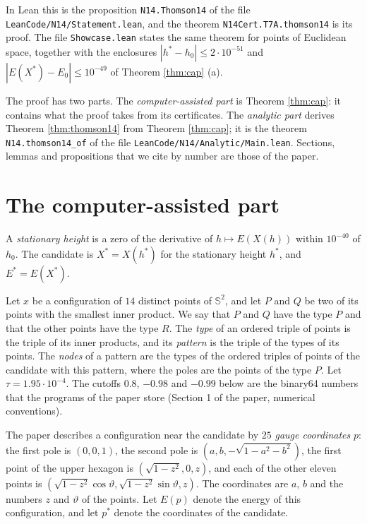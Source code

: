 \documentclass[reqno,a4paper,11pt]{amsart}
\newcommand{\Sph}{\mathbb{S}}
\newcommand{\lean}[1]{\texttt{#1}}
\newcommand{\file}[1]{\nolinkurl{#1}}
\begin{document}
In Lean this is the proposition \lean{N14.Thomson14} of the file \file{LeanCode/N14/Statement.lean}, and the theorem \lean{N14Cert.T7A.thomson14} is its proof. The file \file{Showcase.lean} states the same theorem for points of Euclidean space, together with the enclosures $|h^* - h_0| \leq 2 \cdot 10^{-51}$ and $|E(X^*) - E_0| \leq 10^{-49}$ of Theorem \ref{thm:cap} (a).

The proof has two parts. The \emph{computer-assisted part} is Theorem \ref{thm:cap}: it contains what the proof takes from its certificates. The \emph{analytic part} derives Theorem \ref{thm:thomson14} from Theorem \ref{thm:cap}; it is the theorem \lean{N14.thomson14\_of} of the file \file{LeanCode/N14/Analytic/Main.lean}. Sections, lemmas and propositions that we cite by number are those of the paper.

\section{The computer-assisted part}\label{sec:cap}

A \emph{stationary height} is a zero of the derivative of $h \mapsto E(X(h))$ within $10^{-40}$ of $h_0$. The candidate is $X^* = X(h^*)$ for the stationary height $h^*$, and $E^* = E(X^*)$.

Let $x$ be a configuration of $14$ distinct points of $\Sph^2$, and let $P$ and $Q$ be two of its points with the smallest inner product. We say that $P$ and $Q$ have the type $P$ and that the other points have the type $R$. The \emph{type} of an ordered triple of points is the triple of its inner products, and its \emph{pattern} is the triple of the types of its points. The \emph{nodes} of a pattern are the types of the ordered triples of points of the candidate with this pattern, where the poles are the points of the type $P$. Let $\tau = 1.95 \cdot 10^{-4}$. The cutoffs $0.8$, $-0.98$ and $-0.99$ below are the binary64 numbers that the programs of the paper store (Section 1 of the paper, numerical conventions).

The paper describes a configuration near the candidate by $25$ \emph{gauge coordinates} $p$: the first pole is $(0,0,1)$, the second pole is $(a, b, -\sqrt{1-a^2-b^2})$, the first point of the upper hexagon is $(\sqrt{1-z^2}, 0, z)$, and each of the other eleven points is $(\sqrt{1-z^2} \cos\vartheta, \sqrt{1-z^2} \sin\vartheta, z)$. The coordinates are $a$, $b$ and the numbers $z$ and $\vartheta$ of the points. Let $E(p)$ denote the energy of this configuration, and let $p^*$ denote the coordinates of the candidate.
\end{document}
